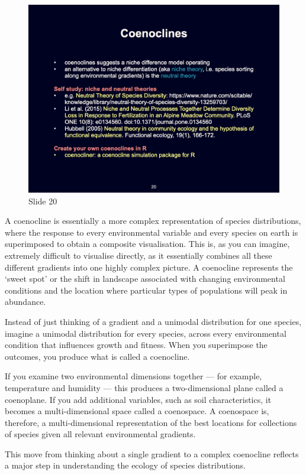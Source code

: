 \documentclass[
  10pt,
]{book}
\begin{document}
\begin{figure}[ht]
\centering
\includegraphics[width=0.8\linewidth]{../images/BDC334/BDC334-020.jpeg}
\caption*{Slide 20}
\end{figure}

A coenocline is essentially a more complex representation of species
distributions, where the response to every environmental variable and
every species on earth is superimposed to obtain a composite
visualisation. This is, as you can imagine, extremely difficult to
visualise directly, as it essentially combines all these different
gradients into one highly complex picture. A coenocline represents the
`sweet spot' or the shift in landscape associated with changing
environmental conditions and the location where particular types of
populations will peak in abundance.

Instead of just thinking of a gradient and a unimodal distribution for
one species, imagine a unimodal distribution for every species, across
every environmental condition that influences growth and fitness. When
you superimpose the outcomes, you produce what is called a coenocline.

If you examine two environmental dimensions together --- for example,
temperature and humidity --- this produces a two-dimensional plane
called a coenoplane. If you add additional variables, such as soil
characteristics, it becomes a multi-dimensional space called a
coenospace. A coenospace is, therefore, a multi-dimensional
representation of the best locations for collections of species given
all relevant environmental gradients.

This move from thinking about a single gradient to a complex coenocline
reflects a major step in understanding the ecology of species
distributions.
\end{document}
